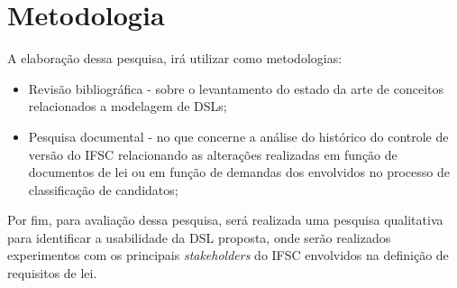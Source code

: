 \section{Metodologia}
\label{metodologia}

A elaboração dessa pesquisa, irá utilizar como metodologias:

\begin{itemize}
    \item Revisão bibliográfica - sobre o levantamento do estado da arte de conceitos relacionados a modelagem de \gls{DSL}s;
    
    \item Pesquisa documental - no que concerne a análise do histórico do controle de versão do \gls{IFSC} relacionando as alterações realizadas em função de documentos de lei ou em função de demandas dos envolvidos no processo de classificação de candidatos;
    
\end{itemize}

Por fim, para avaliação dessa pesquisa, será realizada uma pesquisa qualitativa para identificar a usabilidade da \gls{DSL} proposta, onde serão realizados experimentos com os principais \textit{stakeholders} do \gls{IFSC} envolvidos na definição de requisitos de lei.